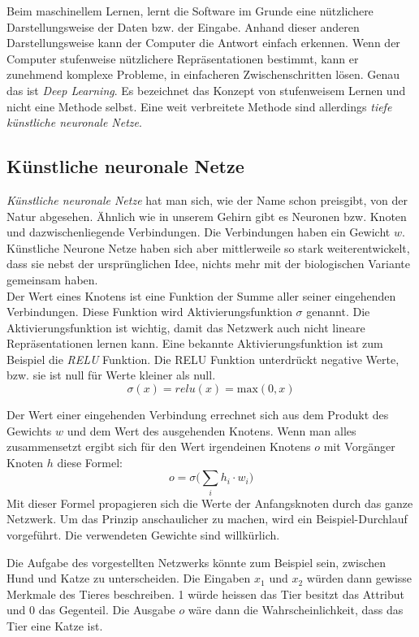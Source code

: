 Beim maschinellem Lernen, lernt die Software im Grunde eine nützlichere Darstellungsweise der Daten bzw. der Eingabe. Anhand dieser anderen Darstellungsweise kann der Computer die Antwort einfach erkennen. Wenn der Computer stufenweise nützlichere Repräsentationen bestimmt, kann er zunehmend komplexe Probleme, in einfacheren Zwischenschritten lösen. Genau das ist \textit{Deep Learning}. Es bezeichnet das Konzept von stufenweisem Lernen und nicht eine Methode selbst. Eine weit verbreitete Methode sind allerdings \textit{tiefe künstliche neuronale Netze}.\parencite[vgl.][]{chollet} 

\subsection{Künstliche neuronale Netze}

\textit{Künstliche neuronale Netze} hat man sich, wie der Name schon preisgibt, von der Natur abgesehen. Ähnlich wie in unserem Gehirn gibt es Neuronen bzw. Knoten und dazwischenliegende Verbindungen. Die Verbindungen haben ein Gewicht $w$. Künstliche Neurone Netze haben sich aber mittlerweile so stark weiterentwickelt, dass sie nebst der ursprünglichen Idee, nichts mehr mit der biologischen Variante gemeinsam haben. \\

Der Wert eines Knotens ist eine Funktion der Summe aller seiner eingehenden Verbindungen. Diese Funktion wird Aktivierungsfunktion $\sigma$ genannt. Die Aktivierungsfunktion ist wichtig, damit das Netzwerk auch nicht lineare Repräsentationen lernen kann. Eine bekannte Aktivierungsfunktion ist zum Beispiel die \textit{RELU} Funktion. Die RELU Funktion unterdrückt negative Werte, bzw. sie ist null für Werte kleiner als null.  \parencite{neuronale_netze} 
$$\sigma(x) = relu(x) = \text{max}(0, x)$$

Der Wert einer eingehenden Verbindung errechnet sich aus dem Produkt des Gewichts $w$ und dem Wert des ausgehenden Knotens. Wenn man alles zusammensetzt ergibt sich für den Wert irgendeinen Knotens $o$ mit Vorgänger Knoten $h$ diese Formel:
$$ o = \sigma\Big(\sum_i h_i \cdot w_{i}\Big)$$
Mit dieser Formel propagieren sich die Werte der Anfangsknoten durch das ganze Netzwerk. Um das Prinzip anschaulicher zu machen, wird ein Beispiel-Durchlauf vorgeführt. Die verwendeten Gewichte sind willkürlich.

Die Aufgabe des vorgestellten Netzwerks könnte zum Beispiel sein, zwischen Hund und Katze zu unterscheiden. Die Eingaben $x_1$ und $x_2$ würden dann gewisse Merkmale des Tieres beschreiben. 1 würde heissen das Tier besitzt das Attribut und 0 das Gegenteil. Die Ausgabe $o$ wäre dann die Wahrscheinlichkeit, dass das Tier eine Katze ist.


